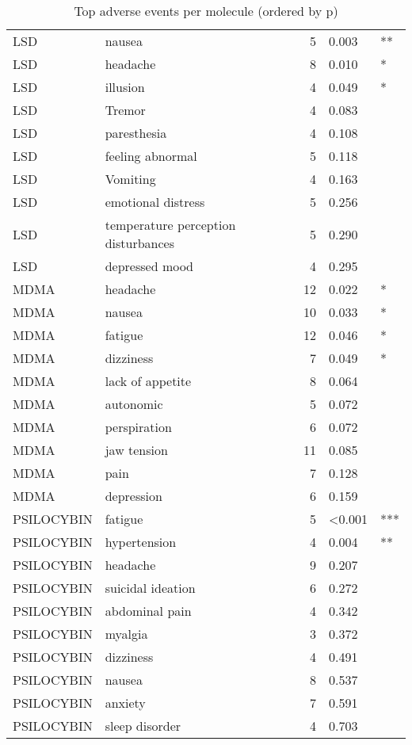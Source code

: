 \begin{table}[!h]
\centering
\caption{Top adverse events per molecule (ordered by p)}
\centering
\begin{tabular}[t]{llrll}
\toprule
LSD & nausea & 5 & 0.003 & **\\
LSD & headache & 8 & 0.010 & *\\
LSD & illusion & 4 & 0.049 & *\\
LSD & Tremor & 4 & 0.083 & \\
LSD & paresthesia & 4 & 0.108 & \\
\addlinespace
LSD & feeling abnormal & 5 & 0.118 & \\
LSD & Vomiting & 4 & 0.163 & \\
LSD & emotional distress & 5 & 0.256 & \\
LSD & temperature perception disturbances & 5 & 0.290 & \\
LSD & depressed mood & 4 & 0.295 & \\
\addlinespace
MDMA & headache & 12 & 0.022 & *\\
MDMA & nausea & 10 & 0.033 & *\\
MDMA & fatigue & 12 & 0.046 & *\\
MDMA & dizziness & 7 & 0.049 & *\\
MDMA & lack of appetite & 8 & 0.064 & \\
\addlinespace
MDMA & autonomic & 5 & 0.072 & \\
MDMA & perspiration & 6 & 0.072 & \\
MDMA & jaw tension & 11 & 0.085 & \\
MDMA & pain & 7 & 0.128 & \\
MDMA & depression & 6 & 0.159 & \\
\addlinespace
PSILOCYBIN & fatigue & 5 & <0.001 & ***\\
PSILOCYBIN & hypertension & 4 & 0.004 & **\\
PSILOCYBIN & headache & 9 & 0.207 & \\
PSILOCYBIN & suicidal ideation & 6 & 0.272 & \\
PSILOCYBIN & abdominal pain & 4 & 0.342 & \\
\addlinespace
PSILOCYBIN & myalgia & 3 & 0.372 & \\
PSILOCYBIN & dizziness & 4 & 0.491 & \\
PSILOCYBIN & nausea & 8 & 0.537 & \\
PSILOCYBIN & anxiety & 7 & 0.591 & \\
PSILOCYBIN & sleep disorder & 4 & 0.703 & \\
\bottomrule
\end{tabular}
\end{table}
